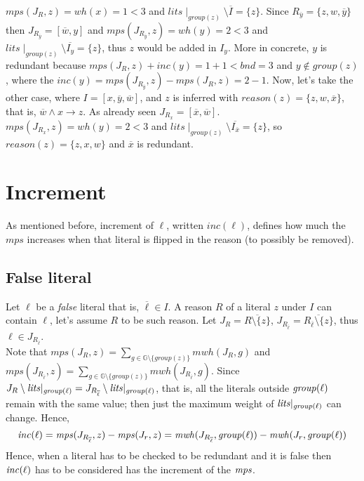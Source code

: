 $mps(J_R,z) = \mathit{wh}(x) = 1 < 3$ and $lits\mid_{group(z)} \setminus \overline{I} = \{z\}$.
Since $R_{\overline{y}} = \{z, w, \overline{y}\}$ then $J_{R_{\overline{y}}} = [\overline{w},y]$ and 
$mps(J_{R_{\overline{y}}},z) = \mathit{wh}(y) = 2 < 3$ and
$lits\mid_{group(z)} \setminus \overline{I_y} = \{z\}$, thus $z$ would be added in $I_y$.
More in concrete, $y$ is redundant because $mps(J_R,z) + \mathit{inc}(y) = 1 + 1 < \mathit{bnd} = 3$ and
$y \not\in group(z)$, where the $\mathit{inc}(y) = mps(J_{R_{\overline{y}}},z) - mps(J_R,z) = 2 - 1$.
Now, let's take the other case, where $I = [x, \overline{y}, \overline{w}]$, 
and $z$ is inferred with $\mathit{reason}(z) = \{z, w, \overline{x}\}$, that is, 
$\overline{w} \land  x \rightarrow z$.
As already seen $J_{R_{x}}=[\overline{x}, \overline{w}]$.\\
$mps(J_{R_{x}},z) = \mathit{wh}(y) = 2 < 3$ and
$lits\mid_{group(z)} \setminus \overline{I_{\overline{x}}} = \{z\}$, 
so $\mathit{reason}(z)=\{z, x, w\}$
and $\overline{x}$ is redundant.

\section{Increment}
\label{sec:increment}
As mentioned before, increment of $\ell$, written $\mathit{inc}(\ell)$, defines 
how much the $mps$ increases when that literal is flipped in the reason (to possibly
be removed).

\subsection{False literal}
Let $\ell$ be a \textit{false} literal that is,
$\overline{\ell} \in I$. 
A reason $R$ of a literal $z$ under $I$ can contain $\ell$, let's assume $R$ to be 
such reason.
Let $J_R = \overline{R \setminus \{z\}}$, 
$J_{R_{\overline{\ell}}} = \overline{R_{\overline{\ell}} \setminus \{z\}}$, thus
$\ell \in J_{R_{\overline{\ell}}}$.\\
Note that $mps(J_R,z) = \sum_{g \in \mathbb{G} \setminus
\{\mathit{group}(z)\}}{\mathit{mwh}(J_R,g)}$ and \\
$mps(J_{R_{\overline{\ell}}},z) = \sum_{g \in \mathbb{G} \setminus
\{\mathit{group}(z)\}}
{\mathit{mwh}(J_{R_{\overline{\ell}}},g)}$.
Since $J_R \setminus \mathit{lits}|_{\mathit{group}(\ell)} = J_{R_{\overline{\ell}}} \setminus \mathit{lits}|_{\mathit{group}(\ell)}$,
that is, all the literals outside $\mathit{group}(\ell)$ remain with the same value;
then just the maximum weight of $\mathit{lits}|_{\mathit{group}(\ell)}$ can change.
Hence,
$$ \mathit{inc}(\ell) = \mathit{mps}(J_{R_{\overline{\ell}}},z)-\mathit{mps}(J_r,z) = 
\mathit{mwh}(J_{R_{\overline{\ell}}},\mathit{group}(\ell)) - \mathit{mwh}(J_r,\mathit{group}(\ell))$$
Hence, when a literal has to be checked to be redundant and it is false then 
$\mathit{inc}(\ell)$ has to be considered has the increment of the $\mathit{mps}$.


